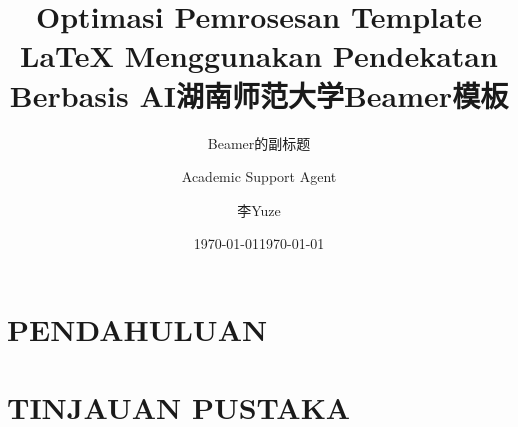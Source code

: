 \documentclass{beamer}
\title{Optimasi Pemrosesan Template LaTeX Menggunakan Pendekatan Berbasis AI}
\author{Academic Support Agent}
\date{\today}
\begin{document}
\maketitle

\begin{abstract}

\end{abstract}

\chapter{PENDAHULUAN}


\chapter{TINJAUAN PUSTAKA}


\usepackage{ctex, hyperref}
\usepackage[T1]{fontenc}

\usepackage{latexsym,amsmath,xcolor,multicol,booktabs,calligra}
\usepackage{graphicx,pstricks,listings,stackengine}
\usepackage{caption, subfigure}

\usepackage[blue]{HUNNUBeamer}

\author[LIYUZE]{李Yuze}
\title{湖南师范大学\textrm{Beamer}模板}
\subtitle{\textrm{Beamer的副标题}}
\date{\today}


\def\cmd#1{\texttt{\color{red}\footnotesize $\backslash$#1}}
\def\env#1{\texttt{\color{blue}\footnotesize #1}}

\end{document}
